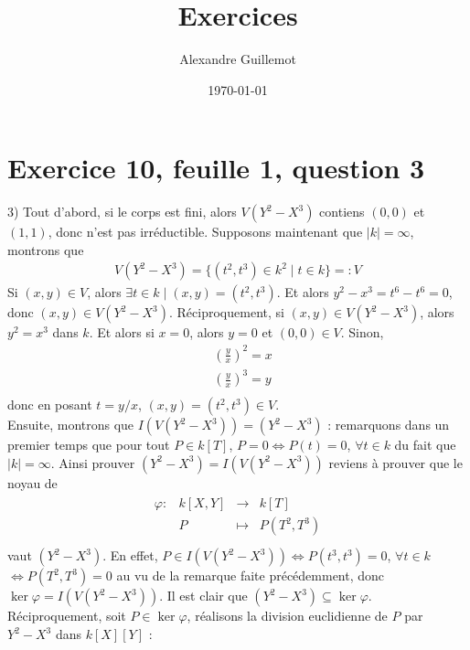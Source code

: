 \documentclass[11pt]{article}
\begin{document}
\title{Exercices}
\date{\today}
\author{Alexandre Guillemot}
\maketitle

\section*{Exercice 10, feuille 1, question 3}
    \begin{question}{3)}
        Tout d'abord, si le corps est fini, alors $V(Y^2 - X^3)$ contiens $(0,0)$ et $(1,1)$, donc n'est pas irréductible. Supposons maintenant que $|k| = \infty$, montrons que
        \begin{align*}
            V(Y^2 - X^3) = \{(t^2, t^3) \in k^2 \mid t \in k\} =: V
        \end{align*}
        Si $(x,y) \in V$, alors $\exists t \in k \mid (x,y) = (t^2, t^3)$. Et alors $y^2 - x^3 = t^6 - t^6 = 0$, donc $(x,y) \in V(Y^2 - X^3)$. Réciproquement, si $(x,y) \in V(Y^2 - X^3)$, alors $y^2 = x^3$ dans $k$. Et alors si $x = 0$, alors $y = 0$ et $(0,0) \in V$. Sinon,
        \begin{align*}
            &\left(\frac{y}{x}\right)^2 = x \\
            &\left(\frac{y}{x}\right)^3 = y \\
        \end{align*}
        donc en posant $t = y/x$, $(x,y) = (t^2, t^3) \in V$. \\
        Ensuite, montrons que $I(V(Y^2 - X^3)) = (Y^2 - X^3)$ : remarquons dans un premier temps que pour tout $P \in k[T]$, $P = 0 \iff P(t) = 0$, $\forall t \in k$ du fait que $|k| = \infty$. Ainsi prouver $(Y^2 - X^3) = I(V(Y^2 - X^3))$ reviens à prouver que le noyau de
        \begin{align*}
            \begin{array}{cccc}
                \varphi : & k[X,Y] & \to & k[T] \\
                & P & \mapsto & P(T^2,T^3) \\
            \end{array}
        \end{align*}
        vaut $(Y^2 - X^3)$. En effet, $P \in I(V(Y^2 - X^3)) \iff P(t^3, t^3) = 0$, $\forall t \in k$ $\iff P(T^2, T^3) = 0$ au vu de la remarque faite précédemment, donc $\ker \varphi = I(V(Y^2 - X^3))$. Il est clair que $(Y^2 - X^3) \subseteq \ker \varphi$. Réciproquement, soit $P \in \ker \varphi$, réalisons la division euclidienne de $P$ par $Y^2 - X^3$ dans $k[X][Y]$ :

\end{question}
\end{document}
